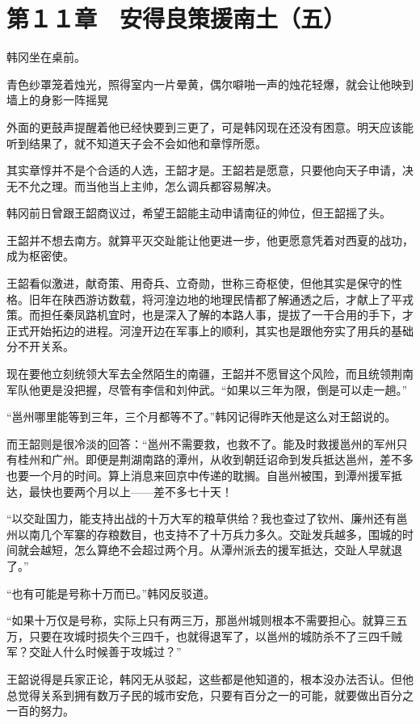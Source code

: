 \section{第１１章　安得良策援南土（五）}

韩冈坐在桌前。

青色纱罩笼着烛光，照得室内一片晕黄，偶尔噼啪一声的烛花轻爆，就会让他映到墙上的身影一阵摇晃

外面的更鼓声提醒着他已经快要到三更了，可是韩冈现在还没有困意。明天应该能听到结果了，就不知道天子会不会如他和章惇所愿。

其实章惇并不是个合适的人选，王韶才是。王韶若是愿意，只要他向天子申请，决无不允之理。而当他当上主帅，怎么调兵都容易解决。

韩冈前日曾跟王韶商议过，希望王韶能主动申请南征的帅位，但王韶摇了头。

王韶并不想去南方。就算平灭交趾能让他更进一步，他更愿意凭着对西夏的战功，成为枢密使。

王韶看似激进，献奇策、用奇兵、立奇勋，世称三奇枢使，但他其实是保守的性格。旧年在陕西游访数载，将河湟边地的地理民情都了解通透之后，才献上了平戎策。而担任秦凤路机宜时，也是深入了解的本路人事，提拔了一干合用的手下，才正式开始拓边的进程。河湟开边在军事上的顺利，其实也是跟他夯实了用兵的基础分不开关系。

现在要他立刻统领大军去全然陌生的南疆，王韶并不愿冒这个风险，而且统领荆南军队他更是没把握，尽管有李信和刘仲武。“如果以三年为限，倒是可以走一趟。”

“邕州哪里能等到三年，三个月都等不了。”韩冈记得昨天他是这么对王韶说的。

而王韶则是很冷淡的回答：“邕州不需要救，也救不了。能及时救援邕州的军州只有桂州和广州。即便是荆湖南路的潭州，从收到朝廷诏命到发兵抵达邕州，差不多也要一个月的时间。算上消息来回京中传递的耽搁。自邕州被围，到潭州援军抵达，最快也要两个月以上——差不多七十天！

“以交趾国力，能支持出战的十万大军的粮草供给？我也查过了钦州、廉州还有邕州以南几个军寨的存粮数目，也支持不了十万兵力多久。交趾发兵越多，围城的时间就会越短，怎么算绝不会超过两个月。从潭州派去的援军抵达，交趾人早就退了。”

“也有可能是号称十万而已。”韩冈反驳道。

“如果十万仅是号称，实际上只有两三万，那邕州城则根本不需要担心。就算三五万，只要在攻城时损失个三四千，也就得退军了，以邕州的城防杀不了三四千贼军？交趾人什么时候善于攻城过？”

王韶说得是兵家正论，韩冈无从驳起，这些都是他知道的，根本没办法否认。但他总觉得关系到拥有数万子民的城市安危，只要有百分之一的可能，就要做出百分之一百的努力。

